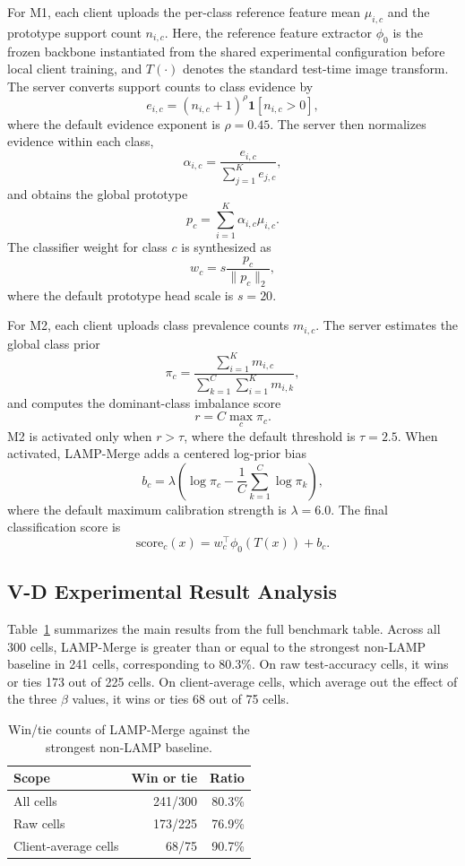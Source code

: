 For M1, each client uploads the per-class reference feature mean $\mu_{i,c}$ and the prototype support count $n_{i,c}$. Here, the reference feature extractor $\phi_0$ is the frozen backbone instantiated from the shared experimental configuration before local client training, and $T(\cdot)$ denotes the standard test-time image transform. The server converts support counts to class evidence by
\[
e_{i,c}=(n_{i,c}+1)^{\rho}\mathbf{1}[n_{i,c}>0],
\]
where the default evidence exponent is $\rho=0.45$. The server then normalizes evidence within each class,
\[
\alpha_{i,c}=\frac{e_{i,c}}{\sum_{j=1}^{K}e_{j,c}},
\]
and obtains the global prototype
\[
p_c=\sum_{i=1}^{K}\alpha_{i,c}\mu_{i,c}.
\]
The classifier weight for class $c$ is synthesized as
\[
w_c=s\frac{p_c}{\|p_c\|_2},
\]
where the default prototype head scale is $s=20$.

For M2, each client uploads class prevalence counts $m_{i,c}$. The server estimates the global class prior
\[
\pi_c=\frac{\sum_{i=1}^{K}m_{i,c}}{\sum_{k=1}^{C}\sum_{i=1}^{K}m_{i,k}},
\]
and computes the dominant-class imbalance score
\[
r=C\max_c \pi_c.
\]
M2 is activated only when $r>\tau$, where the default threshold is $\tau=2.5$. When activated, LAMP-Merge adds a centered log-prior bias
\[
b_c=\lambda\left(\log \pi_c-\frac{1}{C}\sum_{k=1}^{C}\log \pi_k\right),
\]
where the default maximum calibration strength is $\lambda=6.0$. The final classification score is
\[
\mathrm{score}_c(x)=w_c^\top \phi_0(T(x))+b_c.
\]

\subsection{V-D Experimental Result Analysis}
Table~\ref{tab:main-win-summary} summarizes the main results from the full benchmark table. Across all 300 cells, LAMP-Merge is greater than or equal to the strongest non-LAMP baseline in 241 cells, corresponding to 80.3\%. On raw test-accuracy cells, it wins or ties 173 out of 225 cells. On client-average cells, which average out the effect of the three $\beta$ values, it wins or ties 68 out of 75 cells.

\begin{table}[t]
\centering
\caption{Win/tie counts of LAMP-Merge against the strongest non-LAMP baseline.}
\label{tab:main-win-summary}
\small
\begin{tabular}{lrr}
\hline
Scope & Win or tie & Ratio \\
\hline
All cells & 241/300 & 80.3\% \\
Raw cells & 173/225 & 76.9\% \\
Client-average cells & 68/75 & 90.7\% \\
\hline
\end{tabular}
\end{table}

